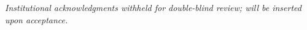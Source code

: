 \documentclass[journal,compsoc]{IEEEtran}
\begin{document}
\begin{tcolorbox}[colback=white, colframe=black, boxrule=0.5pt,
  left=4pt, right=4pt, top=10pt, bottom=10pt, width=\columnwidth,
  halign=center]
\textit{Institutional acknowledgments withheld for double-blind review;
will be inserted upon acceptance.}
\end{tcolorbox}




\end{document}

